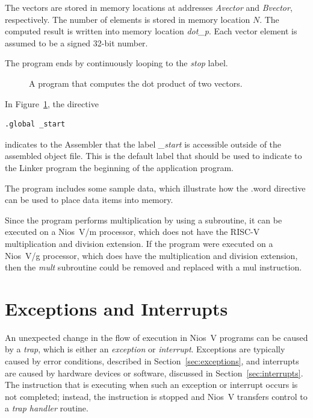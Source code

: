 \documentclass[11pt, twoside, pdftex]{article}
\begin{document}
\noindent
The vectors are stored in memory locations at addresses
{\it Avector} and {\it Bvector}, respectively. The number of elements
is stored in memory location $N$. The computed result is written
into memory location {\it dot\_p}. Each vector element is assumed to be a
signed 32-bit number.

\noindent
The program ends by continuously looping to the {\it stop} label.

\begin{figure}[H]

	\caption{A program that computes the dot product of two vectors.}
	\label{fig:example}
\end{figure}

\newpage
In Figure~\ref{fig:example}, the directive
\begin{center}
\begin{lstlisting}[style=defaultNiosVStyle]
        .global _start
\end{lstlisting}
\end{center} 
\vspace{-\baselineskip}
\noindent
indicates to the Assembler that the label {\it \_start} is accessible outside of the
assembled object file. This is the default label that should be used to indicate to
the Linker program the beginning of the application program.

The program includes some sample data, which illustrate how the {\sf .word} directive 
can be used to place data items into memory. 

Since the program performs multiplication by using a subroutine, it can be executed on a
Nios~V/m processor, which does not have the RISC-V multiplication and division extension.
If the program were executed on a Nios~V/g processor, which does have the multiplication
and division extension, then the {\it mult} subroutine could be removed and replaced with a
{\sf mul} instruction. 

\section{Exceptions and Interrupts}
\label{sec:traps}

An unexpected change in the flow of execution in Nios~V programs can be caused by a
{\it trap}, which is either an
{\it exception} or {\it interrupt}. Exceptions are typically caused by error conditions,
described in Section~\ref{sec:exceptions}, and interrupts are caused by hardware devices
or software, discussed in Section~\ref{sec:interrupts}. The instruction that is executing 
when such an exception or interrupt occurs is not completed; instead, the instruction is
stopped and Nios~V transfers control to a {\it trap handler} routine.
\end{document}
